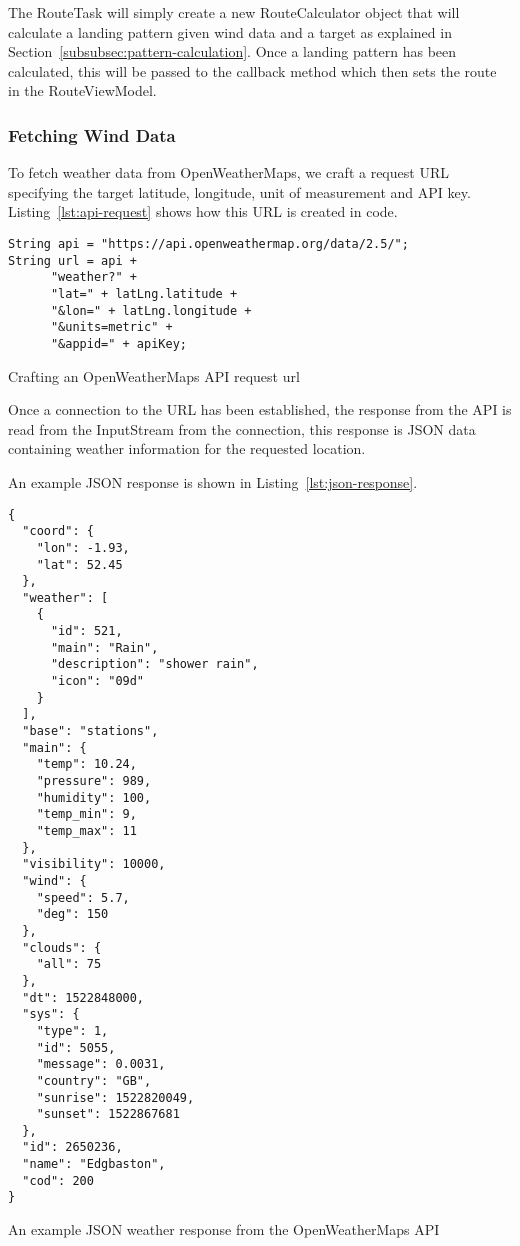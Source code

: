 The RouteTask will simply create a new RouteCalculator object that will calculate a landing pattern given wind data and a target as explained in Section~\vref{subsubsec:pattern-calculation}. Once a landing pattern has been calculated, this will be passed to the callback method which then sets the route in the RouteViewModel.

\subsubsection{Fetching Wind Data}\label{subsubsec:fetching-wind-data}
To fetch weather data from OpenWeatherMaps, we craft a request URL specifying the target latitude, longitude, unit of measurement and API key. Listing~\vref{lst:api-request} shows how this URL is created in code.

\begin{listing*}
  \centering
  \begin{verbatim}
String api = "https://api.openweathermap.org/data/2.5/";
String url = api +
      "weather?" +
      "lat=" + latLng.latitude +
      "&lon=" + latLng.longitude +
      "&units=metric" +
      "&appid=" + apiKey;
  \end{verbatim}
  \caption{Crafting an OpenWeatherMaps API request url}\label{lst:api-request}
\end{listing*}

Once a connection to the URL has been established, the response from the API is read from the InputStream from the connection, this response is JSON data containing weather information for the requested location.

An example JSON response is shown in Listing~\vref{lst:json-response}.

\begin{listing}
  \begin{verbatim}
{
  "coord": {
    "lon": -1.93,
    "lat": 52.45
  },
  "weather": [
    {
      "id": 521,
      "main": "Rain",
      "description": "shower rain",
      "icon": "09d"
    }
  ],
  "base": "stations",
  "main": {
    "temp": 10.24,
    "pressure": 989,
    "humidity": 100,
    "temp_min": 9,
    "temp_max": 11
  },
  "visibility": 10000,
  "wind": {
    "speed": 5.7,
    "deg": 150
  },
  "clouds": {
    "all": 75
  },
  "dt": 1522848000,
  "sys": {
    "type": 1,
    "id": 5055,
    "message": 0.0031,
    "country": "GB",
    "sunrise": 1522820049,
    "sunset": 1522867681
  },
  "id": 2650236,
  "name": "Edgbaston",
  "cod": 200
}
  \end{verbatim}
  \caption{An example JSON weather response from the OpenWeatherMaps API}\label{lst:json-response}
\end{listing}

